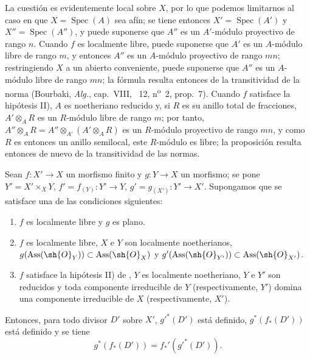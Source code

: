 
La cuestión es evidentemente local sobre $X$, por lo que podemos limitarnos al caso en que $X=\operatorname{Spec}(A)$ sea afín;
se tiene entonces $X'=\operatorname{Spec}(A')$ y $X''=\operatorname{Spec}(A'')$, y puede suponerse que $A''$ es un $A'$-módulo proyectivo de rango $n$.
Cuando $f$ es localmente libre, puede suponerse que $A'$ es un $A$-módulo libre de rango $m$, y entonces $A''$ es un $A$-módulo proyectivo de rango $mn$; restringiendo $X$ a un abierto conveniente, puede suponerse que $A''$ es un $A$-módulo libre de rango $mn$;
la fórmula  resulta entonces de la transitividad de la norma (Bourbaki, \emph{Alg.}, cap.~VIII, \textsection~12, n\textsuperscript{o}~2, prop.~7).
Cuando $f$ satisface la hipótesis II), $A$ es noetheriano reducido y, si $R$ es su anillo total de fracciones, $A'\otimes_A R$ es un $R$-módulo libre de rango $m$; por tanto, $A''\otimes_A R=A''\otimes_{A'}(A'\otimes_A R)$ es un $R$-módulo proyectivo de rango $mn$, y como $R$ es entonces un anillo semilocal, este $R$-módulo es libre;
la proposición resulta entonces de nuevo de la transitividad de las normas.

\begin{proposition}[21.5.8]
\label{IV.21.5.8}
Sean $f:X'\to X$ un morfismo finito y $g:Y\to X$ un morfismo;
se pone $Y'=X'\times_XY$, $f'=f_{(Y)}:Y'\to Y$, $g'=g_{(X')}:Y'\to X'$.
Supongamos que se satisface una de las condiciones siguientes:
\begin{enumerate}[label=\textup{(\roman*)}]
  \item $f$ es localmente libre y $g$ es plano.
  \item $f$ es localmente libre, $X$ e $Y$ son localmente noetherianos, $g(\operatorname{Ass}(\sh{O}_Y))\subset\operatorname{Ass}(\sh{O}_X)$ y $g'(\operatorname{Ass}(\sh{O}_{Y'}))\subset\operatorname{Ass}(\sh{O}_{X'})$.
  \item $f$ satisface la hipótesis \textup{II)} de , $Y$ es localmente noetheriano, $Y$ e $Y'$ son reducidos y toda componente irreducible de $Y$ \textup{(respectivamente,} $Y'$\textup{)} domina una componente irreducible de $X$ \textup{(respectivamente,} $X'$\textup{)}.
\end{enumerate}
Entonces, para todo divisor $D'$ sobre $X'$, $g'^*(D')$ está definido, $g^*(f_*(D'))$ está definido y se tiene
\[
\label{IV.21.5.8.1}
  g^*(f_*(D'))=f_*'(g'^*(D')).
  \tag{21.5.8.1}
\]
\end{proposition}

